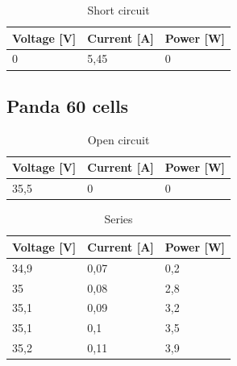 \documentclass[12pt]{article}
\begin{document}
\begin{table}[!h]
	\centering
	\begin{tabular}{|p{2cm}|p{2cm}|p{2cm}|}
		\hline
		\rowcolor{Red!80} Voltage [V] & Current [A] & Power [W] \\
		\hline
		\rowcolor{Red!60} 0           & 5,45        & 0         \\
		\hline
	\end{tabular}
	\caption{Short circuit}
	\label{tab:my_label}
\end{table}
\newpage
\FloatBarrier

\subsection{Panda 60 cells}
\begin{table}[!h]
	\centering
	\begin{tabular}{|p{2cm}|p{2cm}|p{2cm}|}
		\hline
		\rowcolor{RoyalBlue!80} Voltage [V] & Current [A] & Power [W] \\
		\hline
		\rowcolor{Cerulean!70}    35,5      & 0           & 0         \\
		\hline
	\end{tabular}
	\caption{Open circuit}
	\label{tab:my_label}
\end{table}

\begin{table}[!h]
	\centering
	\begin{tabular}{|p{2cm}|p{2cm}|p{2cm}|}
		\hline
		\rowcolor{Green!80} Voltage [V]  & Current [A] & Power [W] \\
		\hline
		\rowcolor{LimeGreen!70}    34,9  & 0,07        & 0,2       \\
		\hline
		\rowcolor{YellowGreen!70}   35   & 0,08        & 2,8       \\
		\hline
		\rowcolor{LimeGreen!70}    35,1  & 0,09        & 3,2       \\
		\hline
		\rowcolor{YellowGreen!70}   35,1 & 0,1         & 3,5       \\
		\hline
		\rowcolor{LimeGreen!70}     35,2 & 0,11        & 3,9       \\
		\hline
	\end{tabular}
	\caption{Series}
	\label{tab:my_label}
\end{table}
\end{document}
